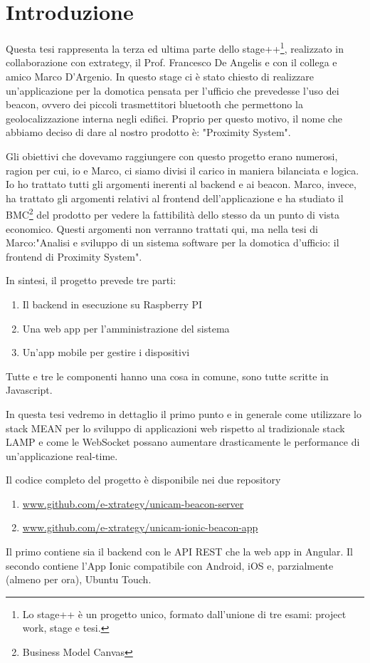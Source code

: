 \chapter{Introduzione}
\label{chap:intro}

Questa tesi rappresenta la terza ed ultima parte dello stage++\footnote{Lo stage++ è un progetto unico, formato dall'unione di tre esami: project work, stage e tesi.},
realizzato in collaborazione con extrategy, il Prof. Francesco De Angelis e con il collega e amico Marco D'Argenio.
In questo stage ci è stato chiesto di realizzare un'applicazione per la domotica pensata per l'ufficio che prevedesse l'uso dei beacon, ovvero dei piccoli trasmettitori bluetooth che permettono la geolocalizzazione interna negli edifici. 
Proprio per questo motivo, il nome che abbiamo deciso di dare al nostro prodotto è: "Proximity System".

Gli obiettivi che dovevamo raggiungere con questo progetto erano numerosi, ragion per cui, io e Marco, ci siamo divisi il carico in maniera bilanciata e logica.
Io ho trattato tutti gli argomenti inerenti al backend e ai beacon. 
Marco, invece, ha trattato gli argomenti relativi al frontend dell'applicazione e ha studiato il BMC\footnote{Business Model Canvas} del prodotto per vedere la fattibilità dello stesso da un punto di vista economico. 
Questi argomenti non verranno trattati qui, ma nella tesi di Marco:"Analisi e sviluppo di un sistema software per la domotica d'ufficio: il frontend di Proximity System".

In sintesi, il progetto prevede tre parti: 
\begin{enumerate}
\item Il backend in esecuzione su Raspberry PI
\item Una web app per l'amministrazione del sistema
\item Un'app mobile per gestire i dispositivi
\end{enumerate}
Tutte e tre le componenti hanno una cosa in comune, sono tutte scritte in Javascript.

In questa tesi vedremo in dettaglio il primo punto e in generale come utilizzare lo stack MEAN per lo sviluppo di applicazioni web rispetto al tradizionale stack LAMP e come le WebSocket possano aumentare drasticamente le performance di un'applicazione real-time.

Il codice completo del progetto è disponibile nei due repository
\begin{enumerate}
\item \url{www.github.com/e-xtrategy/unicam-beacon-server}
\item \url{www.github.com/e-xtrategy/unicam-ionic-beacon-app}
\end{enumerate} 
Il primo contiene sia il backend con le API REST che la web app in Angular.
Il secondo contiene l'App Ionic compatibile con Android, iOS e, parzialmente (almeno per ora), Ubuntu Touch. 


